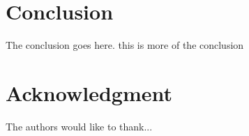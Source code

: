 \documentclass[10pt, conference, compsocconf]{IEEEtran}
\begin{document}
\section{Conclusion}
The conclusion goes here. this is more of the conclusion

\section*{Acknowledgment}
The authors would like to thank...


%

\end{document}

